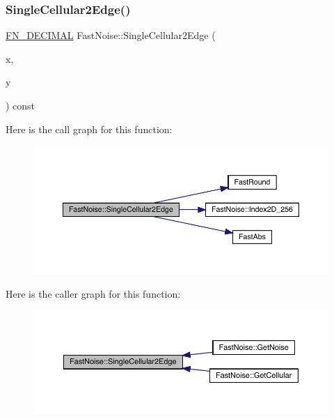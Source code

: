 \subsubsection{\texorpdfstring{Single\+Cellular2\+Edge()}{SingleCellular2Edge()}\hspace{0.1cm}{\footnotesize\ttfamily [1/2]}}
{\footnotesize\ttfamily \mbox{\hyperlink{_fast_noise_8h_a75a9ef6d2541c4921815b885bfd449c3}{F\+N\+\_\+\+D\+E\+C\+I\+M\+AL}} Fast\+Noise\+::\+Single\+Cellular2\+Edge (\begin{DoxyParamCaption}\item[{\mbox{\hyperlink{_fast_noise_8h_a75a9ef6d2541c4921815b885bfd449c3}{F\+N\+\_\+\+D\+E\+C\+I\+M\+AL}}}]{x,  }\item[{\mbox{\hyperlink{_fast_noise_8h_a75a9ef6d2541c4921815b885bfd449c3}{F\+N\+\_\+\+D\+E\+C\+I\+M\+AL}}}]{y }\end{DoxyParamCaption}) const\hspace{0.3cm}{\ttfamily [private]}}

Here is the call graph for this function\+:
\nopagebreak
\begin{figure}[H]
\begin{center}
\leavevmode
\includegraphics[width=350pt]{class_fast_noise_a2b9280204ddb0ffe0b8c3c6502cfe05e_cgraph}
\end{center}
\end{figure}
Here is the caller graph for this function\+:
\nopagebreak
\begin{figure}[H]
\begin{center}
\leavevmode
\includegraphics[width=350pt]{class_fast_noise_a2b9280204ddb0ffe0b8c3c6502cfe05e_icgraph}
\end{center}
\end{figure}
\mbox{\label{class_fast_noise_a10e1d5c203e0d93b70f9f3aa4718e221}} 

